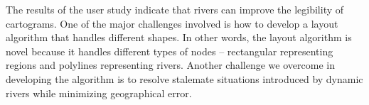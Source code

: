 The results of the user study indicate that rivers can improve the legibility of cartograms. One of the major challenges involved is how to develop a layout algorithm that handles different shapes. In other words, the layout algorithm is novel because it handles different types of nodes -- rectangular representing regions and polylines representing rivers. Another challenge we overcome in developing the algorithm is to resolve stalemate situations introduced by dynamic rivers while minimizing geographical error.